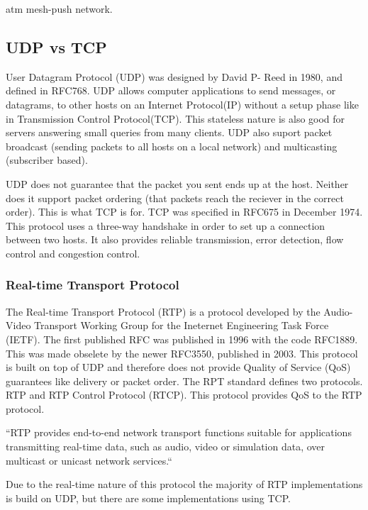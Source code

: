 atm mesh-push network.

\subsection{UDP vs TCP}
User Datagram Protocol (UDP) was designed by David P- Reed in 1980, and defined in RFC768. UDP allows computer applications to send messages, or datagrams, to other hosts on an Internet Protocol(IP) without a setup phase like in Transmission Control Protocol(TCP). This stateless nature is also good for servers answering small queries from many clients. UDP also suport packet broadcast (sending packets to all hosts on a local network) and multicasting (subscriber based).

UDP does not guarantee that the packet you sent ends up at the host. Neither does it support packet ordering (that packets reach the reciever in the correct order). This is what TCP is for. TCP was specified in RFC675 in December 1974. This protocol uses a three-way handshake in order to set up a connection between two hosts. It also provides reliable transmission, error detection, flow control and congestion control. 

\subsubsection{Real-time Transport Protocol}
The Real-time Transport Protocol (RTP) is a protocol developed by the Audio-Video Transport Working Group for the Ineternet Engineering Task Force (IETF). The first published RFC was published in 1996 with the code RFC1889. This was made obselete by the newer RFC3550, published in 2003\cite{RFC3550}. This protocol is built on top of UDP and therefore does not provide Quality of Service (QoS) guarantees like delivery or packet order. The RPT standard defines two protocols. RTP and RTP Control Protocol (RTCP). This protocol provides QoS to the RTP protocol.

``RTP provides end-to-end network transport functions suitable for applications transmitting real-time data, such as audio, video or simulation data, over multicast or unicast network services.``\cite{RFC3550}

Due to the real-time nature of this protocol the majority of RTP implementations is build on UDP, but there are some implementations using TCP.







